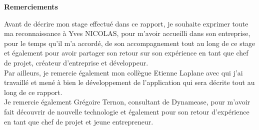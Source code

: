 \begin{center}
        \Huge{\bf Remerciements}\\[1.5cm]
\end{center}

Avant de décrire mon stage effectué dans ce rapport, je souhaite exprimer toute ma reconnaissance à Yves NICOLAS, pour m’avoir accueilli dans son entreprise, pour le temps qu’il m’a accordé, de son accompagnement tout au long de ce stage et également pour avoir partager son retour sur son expérience en tant que chef de projet, créateur d'entreprise et développeur.\\

Par ailleurs, je remercie également mon collègue Etienne Laplane avec qui j’ai travaillé et mené à bien le développement de l’application qui sera décrite tout au long de ce rapport.\\

Je remercie également Grégoire Ternon, consultant de Dynamease, pour m'avoir fait découvrir de nouvelle technologie et également pour son retour d'expérience en tant que chef de projet et jeune entrepreneur. 